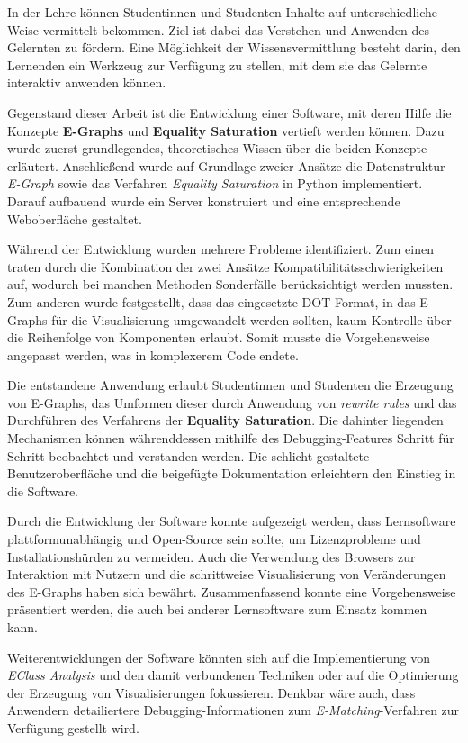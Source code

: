 In der Lehre können Studentinnen und Studenten Inhalte auf unterschiedliche Weise vermittelt bekommen. Ziel ist dabei das Verstehen und Anwenden des Gelernten zu fördern.
Eine Möglichkeit der Wissensvermittlung besteht darin, den Lernenden ein Werkzeug zur Verfügung zu stellen, mit dem sie das Gelernte interaktiv anwenden können.

Gegenstand dieser Arbeit ist die Entwicklung einer Software, mit deren Hilfe die Konzepte \textbf{E-Graphs} und \textbf{Equality Saturation} vertieft werden können.
Dazu wurde zuerst grundlegendes, theoretisches Wissen über die beiden Konzepte erläutert. Anschließend wurde auf Grundlage zweier Ansätze die Datenstruktur \textit{E-Graph}
sowie das Verfahren \textit{Equality Saturation} in Python implementiert. Darauf aufbauend wurde ein Server konstruiert und eine entsprechende Weboberfläche gestaltet.

Während der Entwicklung wurden mehrere Probleme identifiziert. Zum einen traten durch die Kombination der zwei Ansätze Kompatibilitätsschwierigkeiten auf, wodurch bei manchen
Methoden Sonderfälle berücksichtigt werden mussten. Zum anderen wurde festgestellt, dass das eingesetzte DOT-Format, in das E-Graphs für die Visualisierung umgewandelt werden sollten, 
kaum Kontrolle über die Reihenfolge von Komponenten erlaubt. Somit musste die Vorgehensweise angepasst werden, was in komplexerem Code endete.

Die entstandene Anwendung erlaubt Studentinnen und Studenten die Erzeugung von E-Graphs, das Umformen dieser durch Anwendung von \textit{rewrite rules} und das Durchführen
des Verfahrens der \textbf{Equality Saturation}. Die dahinter liegenden Mechanismen können währenddessen mithilfe des Debugging-Features Schritt für Schritt beobachtet und verstanden werden.
Die schlicht gestaltete Benutzeroberfläche und die beigefügte Dokumentation erleichtern den Einstieg in die Software. 

Durch die Entwicklung der Software konnte aufgezeigt werden, dass Lernsoftware plattformunabhängig und Open-Source sein sollte, um Lizenzprobleme und Installationshürden zu vermeiden.
Auch die Verwendung des Browsers zur Interaktion mit Nutzern und die schrittweise Visualisierung von Veränderungen des E-Graphs haben sich bewährt. 
Zusammenfassend konnte eine Vorgehensweise präsentiert werden, die auch bei anderer Lernsoftware zum Einsatz kommen kann.

Weiterentwicklungen der Software könnten sich auf die Implementierung von \textit{EClass Analysis} und den damit verbundenen Techniken oder auf die Optimierung der Erzeugung von
Visualisierungen fokussieren. Denkbar wäre auch, dass Anwendern detailiertere Debugging-Informationen zum \textit{E-Matching}-Verfahren zur Verfügung gestellt wird.

